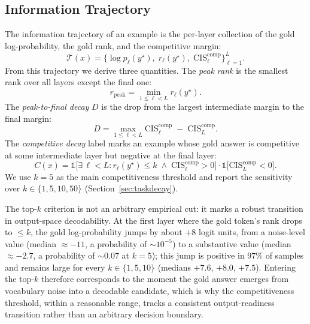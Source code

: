 \documentclass{article} %
\begin{document}
\subsection{Information Trajectory}
The information trajectory of an example is the per-layer collection of the gold log-probability, the gold rank, and the competitive margin:
\begin{equation}
\mathcal{T}(x) = \big\{ \log p_\ell(y^\star),\; r_\ell(y^\star),\; \mathrm{CIS}^{\mathrm{comp}}_\ell \big\}_{\ell=1}^{L} .
\end{equation}
From this trajectory we derive three quantities. The \emph{peak rank} is the smallest rank over all layers except the final one:
\begin{equation}
r_{\mathrm{peak}} = \min_{1 \le \ell < L} r_\ell(y^\star) .
\end{equation}
The \emph{peak-to-final decay} $D$ is the drop from the largest intermediate margin to the final margin:
\begin{equation}
D = \max_{1 \le \ell < L} \mathrm{CIS}^{\mathrm{comp}}_\ell \;-\; \mathrm{CIS}^{\mathrm{comp}}_L .
\end{equation}
The \emph{competitive decay} label marks an example whose gold answer is competitive at some intermediate layer but negative at the final layer:
\begin{equation}
C(x) = \mathbb{1}\Big[ \exists\, \ell < L : r_\ell(y^\star) \le k \;\land\; \mathrm{CIS}^{\mathrm{comp}}_\ell > 0 \Big] \cdot \mathbb{1}\Big[ \mathrm{CIS}^{\mathrm{comp}}_L < 0 \Big] .
\end{equation}
We use $k=5$ as the main competitiveness threshold and report the sensitivity over $k \in \{1,5,10,50\}$ (Section~\ref{sec:taskdecay}).

The top-$k$ criterion is not an arbitrary empirical cut: it marks a robust transition in output-space decodability. At the first layer where the gold token's rank drops to $\le k$, the gold log-probability jumps by about $+8$ logit units, from a noise-level value (median $\approx -11$, a probability of $\sim 10^{-5}$) to a substantive value (median $\approx -2.7$, a probability of $\sim 0.07$ at $k=5$); this jump is positive in $97\%$ of samples and remains large for every $k \in \{1,5,10\}$ (medians $+7.6$, $+8.0$, $+7.5$). Entering the top-$k$ therefore corresponds to the moment the gold answer emerges from vocabulary noise into a decodable candidate, which is why the competitiveness threshold, within a reasonable range, tracks a consistent output-readiness transition rather than an arbitrary decision boundary.
\end{document}
